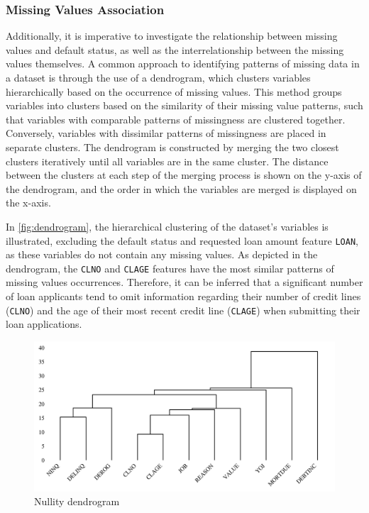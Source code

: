 \subsubsection{Missing Values Association}
Additionally, it is imperative to investigate the relationship between missing values and default status, as well as the interrelationship between the missing values themselves.
A common approach to identifying patterns of missing data in a dataset is through the use of a dendrogram, which clusters variables hierarchically based on the occurrence of missing values.
This method groups variables into clusters based on the similarity of their missing value patterns, such that variables with comparable patterns of missingness are clustered together.
Conversely, variables with dissimilar patterns of missingness are placed in separate clusters.
The dendrogram is constructed by merging the two closest clusters iteratively until all variables are in the same cluster.
The distance between the clusters at each step of the merging process is shown on the y-axis of the dendrogram, and the order in which the variables are merged is displayed on the x-axis.

In \autoref{fig:dendrogram}, the hierarchical clustering of the dataset's variables is illustrated, excluding the default status and requested loan amount feature \texttt{LOAN}, as these variables do not contain any missing values.
As depicted in the dendrogram, the \texttt{CLNO} and \texttt{CLAGE} features have the most similar patterns of missing values occurrences.
Therefore, it can be inferred that a significant number of loan applicants tend to omit information regarding their number of credit lines (\texttt{CLNO}) and the age of their most recent credit line (\texttt{CLAGE}) when submitting their loan applications.

    \begin{figure}[H]
        \centering
        \caption{Nullity dendrogram}\vspace{0.5em}
        \label{fig:dendrogram}
        \includegraphics[width=150mm]{Figures/NA_Dendrogram.jpg}
        \vspace{-1em}
    \end{figure}
    
